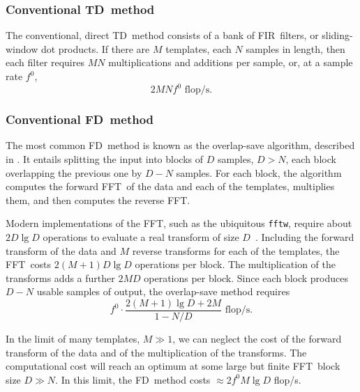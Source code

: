 \documentclass[preprint2]{aastex}
\newcommand{\tmpsamps}{\ensuremath{N}}
\newcommand{\numtmps}{\ensuremath{M}}
\newcommand{\fftblock}{\ensuremath{D}}
\newcommand{\fir}{FIR}%
\newcommand{\fft}{FFT}%
\newcommand{\flops}{flop/s}
\newcommand{\TD}{TD}%
\newcommand{\FD}{FD}%
\begin{document}
\subsubsection{Conventional \TD\ method}

The conventional, direct \TD\ method consists of a bank of \fir\ filters, or
sliding-window dot products.  If there are $\numtmps$ templates, each
$\tmpsamps$ samples in length, then each filter requires $M N$ multiplications
and additions per sample, or, at a sample rate $f^0$,
%
\begin{equation}
	\label{eq:td-flops}
	2 \numtmps \tmpsamps f^0 \textrm{ \flops}.
\end{equation}

\subsubsection{Conventional \FD\ method}

The most common \FD\ method is known as the overlap-save algorithm, described in
\citet{numerical-recipes-chapter-13}.  It entails splitting the input into blocks of $D$
samples, $D > \tmpsamps$, each block overlapping the previous one by $D - \tmpsamps$
samples.  For each block, the algorithm computes the forward \fft\ of the data and
each of the templates, multiplies them, and then computes the reverse \fft.

Modern implementations of the \fft, such as the ubiquitous \texttt{fftw}, require about
$2 \fftblock \lg \fftblock$ operations to evaluate a real transform of size
$\fftblock$~\citep{Johnson:2007p9654}.  Including the forward transform of the data and
$M$ reverse transforms for each of the templates, the \fft\ costs $2 (\numtmps + 1)
\fftblock \lg \fftblock$ operations per block.  The multiplication of the transforms adds
a further $2 \numtmps \fftblock$ operations per block.  Since each block produces
$\fftblock - \tmpsamps$ usable samples of output, the overlap-save method requires
%
\begin{equation}
	\label{eq:fd-flops}
	f^0 \cdot \frac{2 (\numtmps + 1) \lg \fftblock + 2 \numtmps}{1 - \tmpsamps/\fftblock} \textrm{ \flops}.
\end{equation}

In the limit of many templates, $M \gg 1$, we can neglect the cost of the forward
transform of the data and of the multiplication of the transforms.  The computational
cost will reach an optimum at some large but finite \fft\ block size
$\fftblock \gg \tmpsamps$.  In this limit, the \FD\ method costs
$\approx 2 f^0 \numtmps \lg \fftblock$ \flops.
\end{document}
